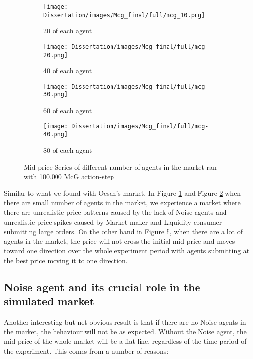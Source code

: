 \begin{figure}[hbt!]
  \begin{subfigure}[b]{0.5\textwidth}
    \texttt{[image: Dissertation/images/Mcg\_final/full/mcg\_10.png]}
    \caption{20 of each agent}
    \label{fig:mcg_all_20}
  \end{subfigure}
  \begin{subfigure}[b]{0.5\textwidth}
    \texttt{[image: Dissertation/images/Mcg\_final/full/mcg-20.png]}
    \caption{40 of each agent}
    \label{fig:mcg_all_40}
  \end{subfigure}

  \begin{subfigure}[b]{0.5\textwidth}
    \texttt{[image: Dissertation/images/Mcg\_final/full/mcg-30.png]}   
    \caption{60 of each agent}
    \label{fig:mcg_all_60}
  \end{subfigure}
  \begin{subfigure}[b]{0.5\textwidth}
    \texttt{[image: Dissertation/images/Mcg\_final/full/mcg-40.png]}
    \caption{80 of each agent}
    \label{fig:mcg_all_80}
  \end{subfigure}
\caption{Mid price Series of different number of agents in the market ran with 100,000 McG action-step} 
\end{figure}
\FloatBarrier

Similar to what we found with Oesch's market, In Figure \ref{fig:mcg_all_20} and Figure \ref{fig:mcg_all_40} when there are small number of agents in the market, we experience a market where there are unrealistic price patterns caused by the lack of Noise agents and unrealistic price spikes caused by Market maker and Liquidity consumer submitting large orders. On the other hand in Figure \ref{fig:mcg_all_80}, when there are a lot of agents in the market, the price will not cross the initial mid price and moves toward one direction over the whole experiment period with agents submitting at the best price moving it to one direction. 

\subsection{Noise agent and its crucial role in the simulated market}

Another interesting but not obvious result is that if there are no Noise agents in the market, the behaviour will not be as expected. Without the Noise agent, the mid-price of the whole market will be a flat line, regardless of the time-period of the experiment. This comes from a number of reasons: 

